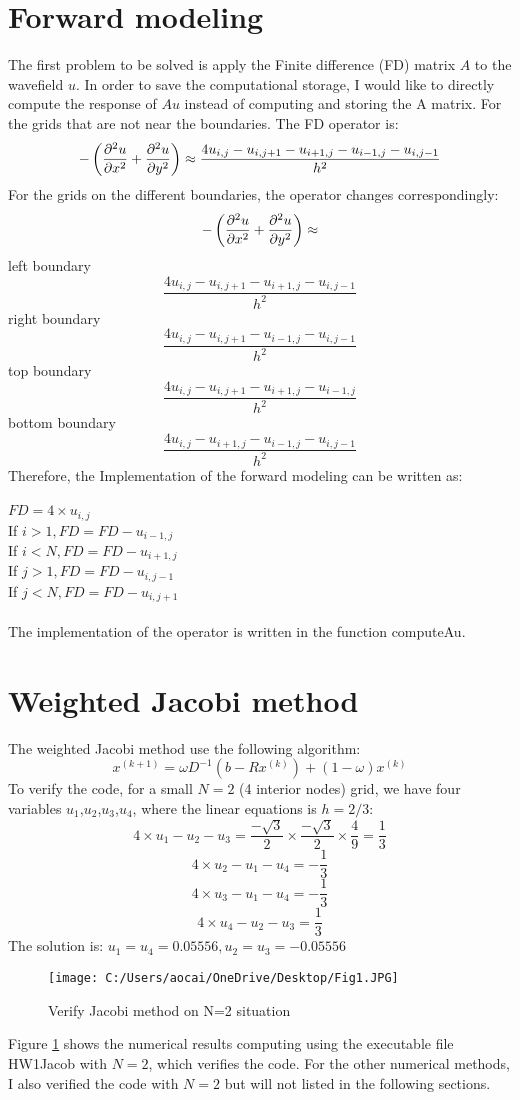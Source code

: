 \documentclass[12pt]{article}
\begin{document}
\section{Forward modeling}
The first problem to be solved is apply the Finite difference (FD) matrix {\bfseries$A$} to the wavefield {\bfseries$u$}. In order to save the computational storage, I would like to directly compute the response of $Au$ instead of computing and storing the A matrix. For the grids that are not near the boundaries. The FD operator is:
$$-\left(\pdv[2]{u}{x} + \pdv[2]{u}{y} \right) \approx \frac{4u_{i,j}-u_{i,j+1}-u_{i+1,j}-u_{i-1,j}-u_{i,j-1}}{h^2} $$
For the grids on the different boundaries, the operator changes correspondingly:
$$-\left(\pdv[2]{u}{x} + \pdv[2]{u}{y} \right) \approx$$
left boundary
$$\frac{4u_{i,j}-u_{i,j+1}-u_{i+1,j}-u_{i,j-1}}{h^2}$$
right boundary
$$\frac{4u_{i,j}-u_{i,j+1}-u_{i-1,j}-u_{i,j-1}}{h^2}$$
top boundary
$$\frac{4u_{i,j}-u_{i,j+1}-u_{i+1,j}-u_{i-1,j}}{h^2}$$
bottom boundary
$$\frac{4u_{i,j}-u_{i+1,j}-u_{i-1,j}-u_{i,j-1}}{h^2}$$
Therefore, the Implementation of the forward modeling can be written as:\\
\\
$FD = 4 \times u_{i,j}$\\
If $ i>1, FD = FD - u_{i-1,j}$ \\
If $ i<N, FD = FD - u_{i+1,j}$ \\
If $ j>1, FD = FD - u_{i,j-1}$ \\
If $ j<N, FD = FD - u_{i,j+1}$ \\
\\
The implementation of the operator is written in the function computeAu.

\section{Weighted Jacobi method}
The weighted Jacobi method use the following algorithm:
$$x^{(k+1)} = \omega D^{-1}(b-Rx^{(k)}) + (1-\omega)x^{(k)}$$
To verify the code, for a small $N=2$ (4 interior nodes) grid, we have four variables $u_1$,$u_2$,$u_3$,$u_4$, where the linear equations is $h = 2/3$:
$$4 \times u_1 -u_2 -u_3 = \frac{-\sqrt{3}}{2} \times \frac{-\sqrt{3}}{2} \times \frac{4}{9}= \frac{1}{3}$$
$$4 \times u_2 -u_1 -u_4 = -\frac{1}{3}$$
$$4 \times u_3 -u_1 -u_4 = -\frac{1}{3}$$
$$4 \times u_4 -u_2 -u_3 = \frac{1}{3}$$
The solution is: $u_1 = u_4 = 0.05556, u_2 = u_3 = -0.05556$

\begin{figure}[H]
	\centering
	\texttt{[image: C:/Users/aocai/OneDrive/Desktop/Fig1.JPG]}
	\caption[Optional caption]{Verify Jacobi method on N=2 situation}
	\label{fig:1}
\end{figure}
Figure \ref{fig:1} shows the numerical results computing using the executable file HW1Jacob with $N=2$, which verifies the code. For the other numerical methods, I also verified the code with $N=2$ but will not listed in the following sections.
\end{document}
